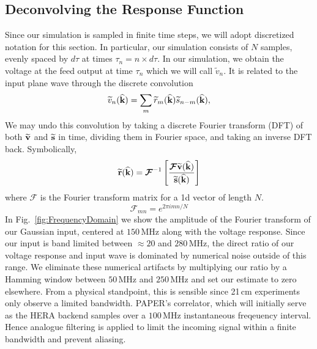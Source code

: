 \documentclass[onecolumn]{emulateapj}
\begin{document}
\subsection{Deconvolving the Response Function}\label{ssec:Deconvolve}
Since our simulation is sampled in finite time steps, we will adopt discretized notation for this section. In particular, our simulation consists of $N$ samples, evenly spaced by $d \tau$ at times $\tau_n = n \times d \tau$. 
In our simulation, we obtain the voltage at the feed output at time $\tau_n$ which we will call $\widetilde{v}_n$. It is related to the input plane wave through the discrete convolution 
\begin{equation}
\widetilde{v}_n({\bf \widehat{k}}) = \sum_m \widetilde{r}_m({\bf \widehat{k}}) \widetilde{s}_{n-m}({\bf \widehat{k}}),
\end{equation}
We may undo this convolution by taking a discrete Fourier transform (DFT) of both ${\bf \widetilde{v}}$ and ${\bf \widetilde{s}}$ in time, dividing them in Fourier space, and taking an inverse DFT back. Symbolically,
\begin{equation}
{\bf \widetilde{r}}({\bf \widehat{k}}) = \boldsymbol{\mathcal{F}}^{-1} \left[ \frac{\boldsymbol{\mathcal{F}} {\bf \widetilde{v}}({\bf \widehat{k}})}{{\bf \widetilde{s}}({\bf \widehat{k}})} \right] 
\end{equation}
where $\boldsymbol{\mathcal{F}}$ is the Fourier transform matrix for a 1d vector of length $N$. 
\begin{equation}
\boldsymbol{\mathcal{F}}_{mn} = e^{2 \pi i m n /N}
\end{equation}
In Fig.~\ref{fig:FrequencyDomain} we show the amplitude of the Fourier transform of our Gaussian input, centered at $150$\,MHz along with the voltage response. Since our input is band limited between $\approx 20$ and $280$\,MHz, the direct ratio of our voltage response and input wave is dominated by numerical noise outside of this range. We eliminate these numerical artifacts by multiplying our ratio by a Hamming window between $50$\,MHz and $250$\,MHz and set our estimate to zero elsewhere. From a physical standpoint, this is sensible since 21\,cm experiments only observe a limited bandwidth. PAPER's correlator, which will initially serve as the HERA backend samples over a $100$\,MHz instantaneous freqeuency interval. Hence analogue filtering is applied to limit the incoming signal within a finite bandwidth and prevent aliasing.
\end{document}
